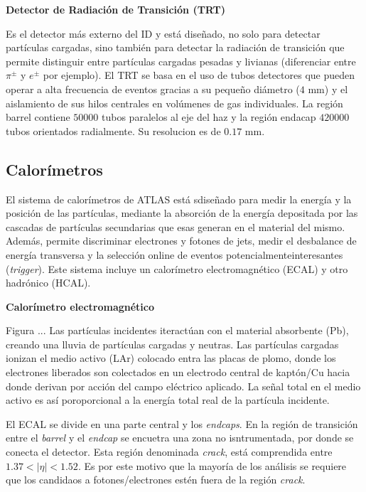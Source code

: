 {\bf Detector de Radiación de Transición (TRT) }

Es el detector más externo del ID y está diseñado, no solo para detectar partículas cargadas, sino también para detectar la radiación de transición que permite distinguir entre partículas cargadas pesadas y livianas (diferenciar entre $\pi^{\pm}$ y $e^{\pm}$ por ejemplo). El TRT se basa en el uso de tubos detectores que pueden operar a alta frecuencia de eventos gracias a su pequeño diámetro ($4$ mm) y el aislamiento de sus hilos centrales en volúmenes de gas individuales. La región barrel contiene $50000$ tubos paralelos al eje del haz y la región endacap $420000$ tubos orientados radialmente. Su resolucion es de $0.17$ mm.

\subsection{Calorímetros}

El sistema de calorímetros de ATLAS está sdiseñado para medir la energía y la posición de las partículas, mediante la absorción de la energía depositada por las cascadas de partículas secundarias que esas generan en el material del mismo. Además, permite discriminar electrones y fotones de jets, medir el desbalance de energía transversa y la selección online de eventos potencialmenteinteresantes (\textit{trigger}). Este sistema incluye un calorímetro electromagnético (ECAL) y otro hadrónico (HCAL).

{\bf Calorímetro electromagnético }

Figura ... Las partículas incidentes iteractúan con el material absorbente (Pb), creando una lluvia de partículas cargadas y neutras. Las partículas cargadas ionizan el medio activo (LAr) colocado entra las placas de plomo, donde los electrones liberados son colectados en un electrodo central de kaptón/Cu hacia donde derivan por acción del campo eléctrico aplicado. La señal total en el medio activo es así poroporcional a la energía total real de la partícula incidente.

El ECAL se divide en una parte central y los \textit{endcaps}. En la región de transición entre el \textit{barrel} y el \textit{endcap} se encuetra una zona no isntrumentada, por donde se conecta el detector. Esta región denominada \textit{crack}, está comprendida entre $1.37 < |\eta| < 1.52$. Es por este motivo que la mayoría de los análisis se requiere que los candidaos a fotones/electrones estén fuera de la región \textit{crack}.

